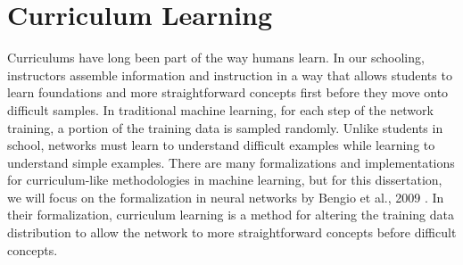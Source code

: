 \section{Curriculum Learning}
\label{chap:intro:sec:cl}
Curriculums have long been part of the way humans learn. In our schooling, instructors assemble information and instruction in a way that allows students to learn foundations and more straightforward concepts first before they move onto difficult samples. In traditional machine learning, for each step of the network training, a portion of the training data is sampled randomly. Unlike students in school, networks must learn to understand difficult examples while learning to understand simple examples. There are many formalizations and implementations for curriculum-like methodologies in machine learning, but for this dissertation, we will focus on the formalization in neural networks by Bengio et al., 2009 \cite{Bengio2009CurriculumL}. In their formalization, curriculum learning is a method for altering the training data distribution to allow the network to more straightforward concepts before difficult concepts.
